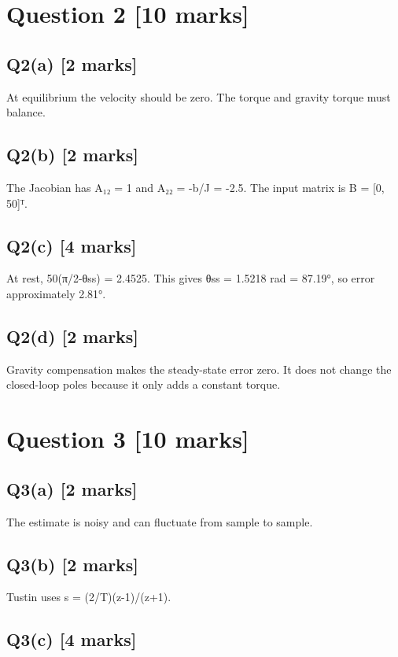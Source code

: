 \documentclass[11pt,a4paper]{article}
\begin{document}
\section*{Question 2 \hfill [10 marks]}
\subsection*{Q2(a) \hfill [2 marks]}

At equilibrium the velocity should be zero.
The torque and gravity torque must balance.

\subsection*{Q2(b) \hfill [2 marks]}

The Jacobian has A₁₂ = 1 and A₂₂ = -b/J = -2.5.
The input matrix is B = [0, 50]ᵀ.

\subsection*{Q2(c) \hfill [4 marks]}

At rest, 50(π/2-θss) = 2.4525.
This gives θss = 1.5218 rad = 87.19°, so error approximately 2.81°.

\subsection*{Q2(d) \hfill [2 marks]}

Gravity compensation makes the steady-state error zero.
It does not change the closed-loop poles because it only adds a constant torque.

\section*{Question 3 \hfill [10 marks]}
\subsection*{Q3(a) \hfill [2 marks]}

The estimate is noisy and can fluctuate from sample to sample.

\subsection*{Q3(b) \hfill [2 marks]}

Tustin uses s = (2/T)(z-1)/(z+1).

\subsection*{Q3(c) \hfill [4 marks]}
\end{document}

